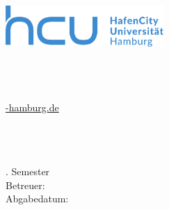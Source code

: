\begin{titlepage}
	\thispagestyle{empty}
	
	\begin{minipage}[t]{0.4\textwidth}
		\vspace{0pt}
		\includegraphics[width=60mm]{Daten/hcu_logo.pdf}
	\end{minipage}
	\hfill
	\begin{minipage}[t]{0.5\textwidth}
		\vspace{0pt}
		\begin{flushright}
			\Verfasser\\
			\Matrikel\\
			\Modul\\
			\href{mailto:\Mail@hcu-hamburg.de}{\Mail@hcu-hamburg.de} \\
		\end{flushright}
	\end{minipage}
	
	\vspace{150pt}
	
	\begin {center}
	\Large \Art
	\end {center}
	\begin {center}
	\huge \Titel
	\end {center}
	
	\vfill
	
	\begin{flushleft}
		\Veranstaltung\\
		\Semester \\
		\Studiengang\\
		\Fachsemester. Semester\\
		\vspace{10pt}
		Betreuer: \\ 
		\Betreuer
		\vspace{30pt}
		Abgabedatum: \Abgabe
	\end{flushleft}
	
\end{titlepage}